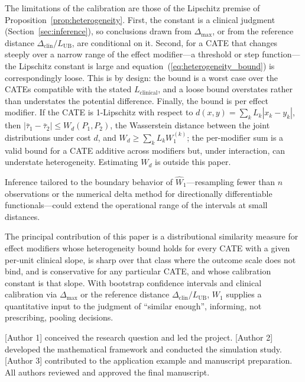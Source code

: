 \documentclass[AMA,Times1COL]{WileyNJDv5}
\begin{document}
The limitations of the calibration are those of the Lipschitz premise of Proposition~\ref{prop:heterogeneity}. First, the constant is a clinical judgment (Section~\ref{sec:inference}), so conclusions drawn from $\Delta_{\max}$, or from the reference distance $\Delta_{\text{clin}} / L_{\text{UB}}$, are conditional on it. Second, for a CATE that changes steeply over a narrow range of the effect modifier---a threshold or step function---the Lipschitz constant is large and equation~(\ref{eq:heterogeneity_bound}) is correspondingly loose. This is by design: the bound is a worst case over the CATEs compatible with the stated $L_{\text{clinical}}$, and a loose bound overstates rather than understates the potential difference. %
Finally, the bound is per effect modifier. If the CATE is 1-Lipschitz with respect to $d(x, y) = \sum_k L_k |x_k - y_k|$, then $|\bar{\tau}_1 - \bar{\tau}_2| \leq W_d(P_1, P_2)$, the Wasserstein distance between the joint distributions under cost $d$, and $W_d \geq \sum_k L_k W_1^{(k)}$; the per-modifier sum is a valid bound for a CATE additive across modifiers but, under interaction, can understate heterogeneity. Estimating $W_d$ is outside this paper.

Inference tailored to the boundary behavior of $\widehat{W}_1$---resampling fewer than $n$ observations\cite{bickel1997} or the numerical delta method for directionally differentiable functionals\cite{hong2018}---could extend the operational range of the intervals at small distances.

The principal contribution of this paper is a distributional similarity measure for effect modifiers whose heterogeneity bound holds for every CATE with a given per-unit clinical slope, is sharp over that class where the outcome scale does not bind, and is conservative for any particular CATE, and whose calibration constant is that slope. With bootstrap confidence intervals and clinical calibration via $\Delta_{\max}$ or the reference distance $\Delta_{\text{clin}} / L_{\text{UB}}$, $W_1$ supplies a quantitative input to the judgment of ``similar enough'', informing, not prescribing, pooling decisions.



[Author 1] conceived the research question and led the project. [Author 2] developed the mathematical framework and conducted the simulation study. [Author 3] contributed to the application example and manuscript preparation. All authors reviewed and approved the final manuscript.
\end{document}
